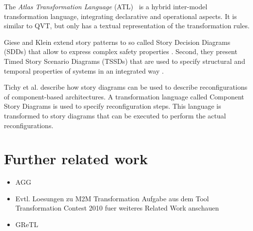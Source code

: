 The \emph{Atlas Transformation Language} (ATL)~\cite{ATL} is a hybrid inter-model transformation language, integrating declarative and operational aspects.
It is similar to QVT, but only has a textual representation of the transformation rules.

Giese and Klein extend story patterns to so called Story Decision Diagrams (SDDs) that allow to express complex safety properties \cite{GK06a}.
Second, they present Timed Story Scenario Diagrams (TSSDs) that are used to specify structural and temporal properties of systems in an integrated way \cite{KG07a}.

Tichy et al. \cite{THH+08} describe how story diagrams can be used to describe reconfigurations of component-based architectures.
A transformation language called Component Story Diagrams is used to specify reconfiguration steps.
This language is transformed to story diagrams that can be executed to perform the actual reconfigurations.

\section*{Further related work}

\begin{itemize}
\item AGG
\item Evtl. Loesungen zu M2M Transformation Aufgabe aus dem Tool Transformation Contest 2010 fuer weiteres Related Work anschauen
\item GReTL \cite{HE11}
\end{itemize}